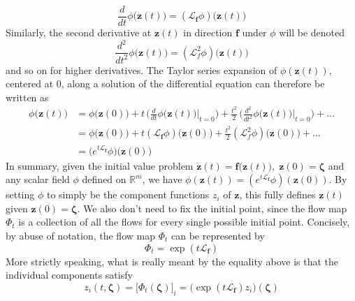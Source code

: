       \begin{equation}
        \frac{d}{dt} \phi\big(\mathbf{z}(t)\big) = ( \mathcal{L}_\mathbf{f} \phi) \big(\mathbf{z}(t) \big)
      \end{equation}
      Similarly, the second derivative at $\mathbf{z}(t)$ in direction $\mathbf{f}$ under $\phi$ will be denoted 
      \begin{equation}
        \frac{d^2}{dt^2} \phi\big( \mathbf{z}(t) \big) = (\mathcal{L}_f^2 \phi) \big( \mathbf{z}(t) \big)
      \end{equation}
      and so on for higher derivatives. The Taylor series expansion of $\phi(\mathbf{z}(t))$, centered at $0$, along a solution of the differential equation can therefore be written as 
      \begin{align*}
        \phi \big(\mathbf{z}(t) \big) & = \phi \big(\mathbf{z}(0) \big) + t \, \bigg( \frac{d}{dt} \phi \big( \mathbf{z}(t)\big) \bigg|_{t = 0} \bigg) + \frac{t^2}{2} \, \bigg( \frac{d^2}{dt^2} \phi\big( \mathbf{z}(t)\big) \bigg|_{t = 0} \bigg) + \ldots \\
        & = \phi \big(\mathbf{z}(0) \big) + t (\mathcal{L}_\mathbf{f} \phi) \big( \mathbf{z}(0) \big) + \frac{t^2}{2} ( \mathcal{L}_f^2 \phi) \big( \mathbf{z}(0)\big) + \ldots \\
        & = \big( e^{t \mathcal{L}_\mathbf{f}} \phi) \big( \mathbf{z}(0)\big) 
      \end{align*}
      In summary, given the initial value problem $\mathbf{\dot{z}}(t) = \mathbf{f}\big( \mathbf{z}(t)\big), \; \mathbf{z}(0) = \boldsymbol{\zeta}$ and any scalar field $\phi$ defined on $\mathbb{R}^m$, we have $\phi( \mathbf{z}(t)) = ( e^{t \mathcal{L}_\mathbf{f}} \phi)(\mathbf{z}(0))$. By setting $\phi$ to simply be the component functions $z_i$ of $\mathbf{z}$, this fully defines $\mathbf{z}(t)$ given $\mathbf{z}(0) = \boldsymbol{\zeta}$. We also don't need to fix the initial point, since the flow map $\Phi_t$ is a collection of all the flows for every single possible initial point. Concisely, by abuse of notation, the flow map $\Phi_t$ can be represented by 
      \begin{equation}
        \Phi_t = \exp(t \mathcal{L}_\mathbf{f})
      \end{equation}
      More strictly speaking, what is really meant by the equality above is that the individual components satisfy 
      \begin{equation}
        z_i (t, \boldsymbol{\zeta}) = \big[ \Phi_t (\boldsymbol{\zeta}) \big]_i = \big(\exp(t \mathcal{L}_\mathbf{f}) z_i \big) (\boldsymbol{\zeta})
      \end{equation}
